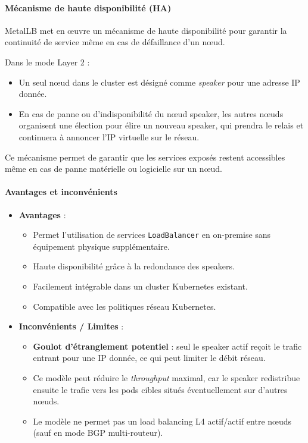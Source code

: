 \paragraph{Mécanisme de haute disponibilité (HA)}

MetalLB met en œuvre un mécanisme de haute disponibilité pour garantir la continuité de service même en cas de défaillance d’un nœud.

Dans le mode Layer 2 :
\begin{itemize}
	\item Un seul nœud dans le cluster est désigné comme \emph{speaker} pour une adresse IP donnée.
	\item En cas de panne ou d’indisponibilité du nœud speaker, les autres nœuds organisent une élection pour élire un nouveau speaker, qui prendra le relais et continuera à annoncer l’IP virtuelle sur le réseau.
\end{itemize}

Ce mécanisme permet de garantir que les services exposés restent accessibles même en cas de panne matérielle ou logicielle sur un nœud.

\paragraph{Avantages et inconvénients}

\begin{itemize}
	\item \textbf{Avantages} :
	      \begin{itemize}
		      \item Permet l’utilisation de services \texttt{LoadBalancer} en on-premise sans équipement physique supplémentaire.
		      \item Haute disponibilité grâce à la redondance des speakers.
		      \item Facilement intégrable dans un cluster Kubernetes existant.
		      \item Compatible avec les politiques réseau Kubernetes.
	      \end{itemize}

	\item \textbf{Inconvénients / Limites} :
	      \begin{itemize}
		      \item \textbf{Goulot d’étranglement potentiel} : seul le speaker actif reçoit le trafic entrant pour une IP donnée, ce qui peut limiter le débit réseau.
		      \item Ce modèle peut réduire le \emph{throughput} maximal, car le speaker redistribue ensuite le trafic vers les pods cibles situés éventuellement sur d'autres nœuds.
		      \item Le modèle ne permet pas un load balancing L4 actif/actif entre nœuds (sauf en mode BGP multi-routeur).
	      \end{itemize}
\end{itemize}

